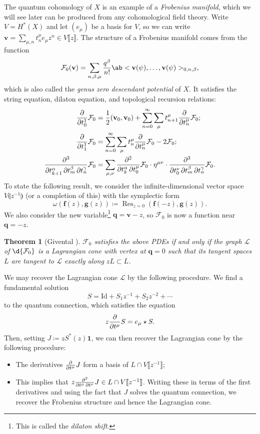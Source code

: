 \documentclass{amsart}
\newtheorem{thm}{Theorem}[section]
\theoremstyle{definition}
\theoremstyle{remark}
\theoremstyle{plain}
\theoremstyle{definition}
\theoremstyle{remark}
\newcommand{\mc}[1]{\mathcal{#1}}
\newcommand{\mbf}[1]{\mathbf{#1}}
\newcommand{\bv}{\mbf{v}}
\newcommand{\bq}{\mbf{q}}
\newcommand{\mr}[1]{\mathrm{#1}}
\newcommand{\on}[1]{\operatorname{#1}}
\newcommand{\1}{\mathbf{1}}
\newcommand{\2}{\mathbf{2}}
\newcommand{\3}{\mathbf{3}}
\newcommand{\ps}[1]{\llbracket #1 \rrbracket}
\newcommand{\ls}[1]{\llparenthesis #1 \rrparenthesis}
\begin{document}
The quantum cohomology of \(X\) is an example of a \textit{Frobenius manifold}, which we will see later can be produced from any cohomological field theory. Write \(V = H^*(X)\) and let \((e_{\mu})\) be a basis for \(V\), so we can write $\bv = \sum_{\mu,n} t^{\mu}_n e_{\mu} z^n \in V\ps{z}$.
The structure of a Frobenius manifold comes from the function
\[
    \mc{F}_0(\bv) = \sum_{n, \beta, \mu} \frac{q^{\beta}}{n!} \ab<\bv(\psi), \ldots, \bv(\psi)>_{0,n,\beta},
\]
which is also called the \textit{genus zero descendant potential} of \(X\). It satisfies the string equation, dilaton equation, and topological recursion relations: 
\begin{align*}
    \pdv{}{t_0^1} \mc{F}_0 &= \frac{1}{2} (\bv_0, \bv_0) + \sum_{n=0}^{\infty} \sum_{\mu} t_{n+1}^{\mu} \pdv{}{t_n^{\mu}} \mc{F}_0; \\
    \pdv{}{t_1^1} \mc{F}_0 &= \sum_{n=0}^{\infty} \sum_{\mu} t_n^{\mu} \pdv{}{t_n^{\mu}}\mc{F}_0 - 2 \mc{F}_0; \\
    \pdv{}{t_{k+1}^{\alpha},t_m^{\beta},t_n^{\gamma}} \mc{F}_0 &= \sum_{\mu,\nu} \pdv{}{t_k^{\alpha},t_0^{\mu}} \mc{F}_0 \cdot \eta^{\mu\nu} \cdot \pdv{}{t_0^{\nu},t_{m}^{\beta},t_n^{\gamma}} \mc{F}_0.
\end{align*}
To state the following result, we consider the infinite-dimensional vector space $V\ls{z^{-1}}$ (or a completion of this) with the symplectic form
\[ \omega(\mbf{f}(z), \mbf{g}(z)) \coloneqq \on{Res}_{z=0}(\mbf{f}(-z), \mbf{g}(z)). \]
We also consider the new variable\footnote{This is called the \textit{dilaton shift}.} $\bq = \bv - z$, so $\mc{F}_0$ is now a function near $\bq = -z$.

\begin{thm}[Givental {\cite{Givental2004}}]
    $\mc{F}_0$ satisfies the above PDEs if and only if the graph $\mc{L}$ of $\d{\mc{F}_0}$ is a Lagrangian cone with vertex at $\bq = 0$ such that its tangent spaces $L$ are tangent to $\mc{L}$ exactly along $zL \subset L$.
\end{thm}

We may recover the Lagrangian cone $\mc{L}$ by the following procedure. We find a fundamental solution 
\[ S = \mr{Id} + S_1 z^{-1} + S_2 z^{-2} + \cdots \]
to the quantum connection, which satisfies the equation
\[ z \pdv{}{t^{\mu}}S = e_{\mu} \star S. \]
Then, setting $J \coloneqq z S^*(z) \1$, we can then recover the Lagrangian cone by the following procedure:
\begin{itemize}
    \item The derivatives $\pdv{}{t^{\mu}} J$ form a basis of $L \cap V\ps{z^{-1}}$;
    \item This implies that $z \pdv{}{t^{\mu},t^{\nu}} J \in L \cap V \ps{z^{-1}}$. Writing these in terms of the first derivatives and using the fact that $J$ solves the quantum connection, we recover the Frobenius structure and hence the Lagrangian cone.
\end{itemize}
\end{document}
